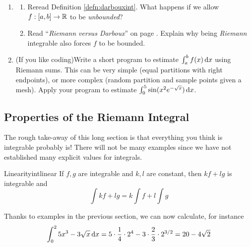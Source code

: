 \begin{exercises}
\begin{enumerate}
	\item\begin{enumerate}
	  \item Reread Definition \ref{defn:darbouxint}. What happens if we allow $f:[a,b]\to\mathbb{R}$ to be \emph{unbounded}?
	  \item Read ``\emph{Riemann versus Darboux}'' on page \pageref{pg:riemanndefthm}. Explain why being \emph{Riemann} integrable also forces $f$ to be bounded.
	\end{enumerate}

	\item (If you like coding)\quad Write a short program to estimate $\int_a^bf(x)\,{\mathrm{d} x}$ using Riemann sums. This can be very simple (equal partitions with right endpoints), or more complex (random partition and sample points given a mesh). Apply your program to estimate $\int_0^{5}\sin(x^2e^{-\sqrt x})\,{\mathrm{d} x}$.
\end{enumerate}
\end{exercises}


\clearpage


\subsection{Properties of the Riemann Integral}\label{sec:riemannproperties}

The rough take-away of this long section is that everything you think is integrable probably is! There will not be many examples since we have not established many explicit values for integrals.


\begin{thm}{Linearity}{intlinear}
If $f,g$ are integrable and $k,l$ are constant, then $kf+lg$ is integrable and
\[\int  kf+lg=k\int f+l\int g\]
\end{thm}

\begin{example}{}{}
Thanks to examples in the previous section, we can now calculate, for instance
\[\int_0^25x^3-3\sqrt x\,{\mathrm{d} x}=5\cdot\frac 14\cdot 2^4 -3\cdot \frac 23\cdot 2^{3/2} =20-4\sqrt 2\]
\end{example}

